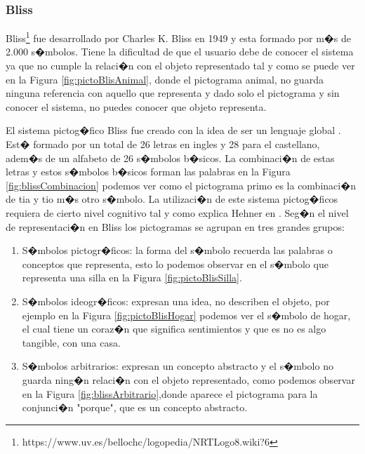 \subsubsection{Bliss}

Bliss\footnote{https://www.uv.es/bellochc/logopedia/NRTLogo8.wiki?6} fue desarrollado por Charles K. Bliss en 1949 y esta formado por m�s de 2.000 s�mbolos. Tiene la dificultad de que el usuario debe de conocer el sistema ya que no cumple la relaci�n con el objeto representado tal y como se puede ver en la Figura \ref{fig:pictoBlisAnimal}, donde el pictograma animal, no guarda ninguna referencia con aquello que representa y dado solo el pictograma y sin conocer el sistema, no puedes conocer que objeto representa.

El sistema pictog�fico Bliss\citep{Eugene1985} fue creado con la idea de ser un lenguaje global . Est� formado por un total de 26 letras en ingles y 28 para el castellano, adem�s de un alfabeto de 26 s�mbolos b�sicos. La combinaci�n de estas letras y estos s�mbolos b�sicos forman las palabras en la Figura \ref{fig:blissCombinacion} podemos ver como el pictograma primo es la combinaci�n de tia y tio m�s otro s�mbolo. La utilizaci�n de este sistema pictog�ficos requiera de cierto nivel cognitivo tal y como explica Hehner en \citep{hehner1985}. Seg�n el nivel de representaci�n en Bliss los pictogramas se agrupan en tres grandes grupos:
\begin{enumerate}
	
	\item S�mbolos pictogr�ficos: la forma del s�mbolo recuerda las palabras o conceptos que representa, esto lo podemos observar en el s�mbolo que representa una silla en la Figura \ref{fig:pictoBlisSilla}.
	\item S�mbolos ideogr�ficos: expresan una idea, no describen el objeto, por ejemplo en la Figura \ref{fig:pictoBlisHogar} podemos ver el s�mbolo de hogar, el cual tiene un coraz�n que significa sentimientos y que es no es algo tangible, con una casa.
	\item S�mbolos arbitrarios: expresan un concepto abstracto y el s�mbolo no guarda ning�n relaci�n con el objeto representado, como podemos observar en la Figura \ref{fig:blissArbitrario},donde aparece el pictograma para la conjunci�n "porque", que es un concepto abstracto.


\end{enumerate}


